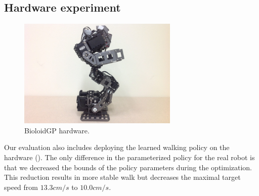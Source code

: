 \subsection{Hardware experiment}
\begin{figure}
\center
  \includegraphics[width=3.0in]{images/hardware}
  \caption{
    BioloidGP hardware.
  }
  \label{fig:optskills_hardware}
\end{figure}
Our evaluation also includes deploying the learned walking policy on
the hardware (). The only difference in the
parameterized policy for the real robot is that we decreased the
bounds of the policy parameters during the optimization. This
reduction results in more stable walk but decreases the maximal target
speed from $13.3cm/s$ to $10.0 cm/s$.

